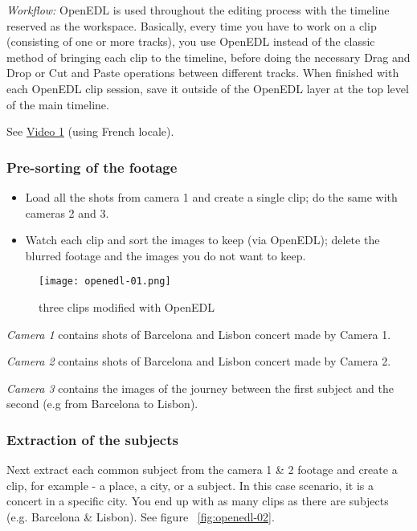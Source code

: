 \textit{Workflow:} OpenEDL is used throughout the editing process with the timeline reserved as the workspace. Basically, every time you have to work on a clip (consisting of one or more tracks), you use OpenEDL instead of the classic method of bringing each clip to the timeline, before doing the necessary Drag and Drop or Cut and Paste operations between different tracks. When finished with each
OpenEDL clip session, save it outside of the OpenEDL layer at the top level of the main timeline.

See \href{https://youtu.be/0li5DdeQ6_o}{Video 1} (using French locale).


\subsubsection*{Pre-sorting of the footage}
\label{ssub:pre_sorting_footage}

	\begin{itemize}
		\item Load all the shots from camera 1 and create a single clip; do the same with cameras 2 and 3.
		\item Watch each clip and sort the images to keep (via OpenEDL); delete the blurred footage and the images you do not want to keep.
	\end{itemize}

\begin{figure}[htpb]
	\centering
	\texttt{[image: openedl-01.png]}
	\caption{three clips modified with OpenEDL}
	\label{fig:openedl-01}
\end{figure}

\textit{Camera 1} contains shots of Barcelona and Lisbon concert made by Camera 1.

\textit{Camera 2} contains shots of Barcelona and Lisbon concert made by Camera 2.

\textit{Camera 3} contains the images of the journey between the first subject and the second (e.g from Barcelona to Lisbon).

\subsubsection*{Extraction of the subjects}
\label{ssub:extraction_subjects}

Next extract each common subject from the camera 1 \& 2 footage and create a clip, for example - a place, a city, or a subject. In this case scenario, it is a concert in a specific city.
You end up with as many clips as there are subjects (e.g. Barcelona \& Lisbon).
 See figure ~\ref{fig:openedl-02}.

